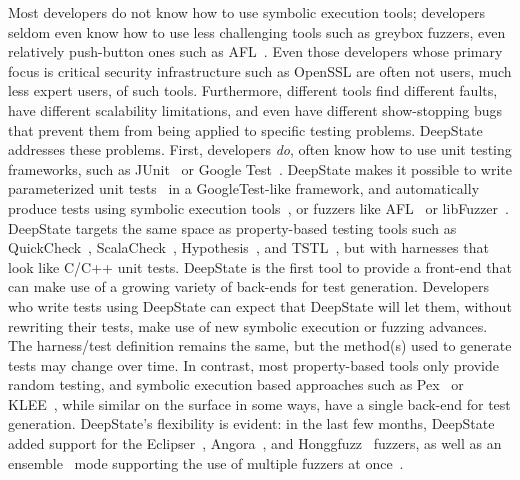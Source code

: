 Most developers do not know how to use symbolic execution tools; developers seldom even know how to use less challenging tools such as greybox fuzzers, even relatively push-button ones such as AFL~\cite{aflfuzz}.  Even those developers whose primary focus is critical security infrastructure such as OpenSSL are often not users, much less expert users, of such tools.  Furthermore, different tools find different faults, have different scalability limitations, and even have different show-stopping bugs that prevent them from being applied to specific testing problems.  DeepState~\cite{DeepState} addresses these problems.  First, developers \emph{do}, often know how to use unit testing frameworks, such as JUnit~\cite{JUnit} or Google Test~\cite{GoogleTest}. DeepState makes it possible to write parameterized unit tests~\cite{ParamUnit} in a GoogleTest-like framework, and automatically produce tests using symbolic execution tools~\cite{angr1,angr2,angr3,Manticore}, or fuzzers like AFL~\cite{aflfuzz} or libFuzzer~\cite{libFuzzer}.  DeepState targets the same space as property-based testing tools such as QuickCheck~\cite{ClaessenH00}, ScalaCheck~\cite{ScalaCheckDoc}, Hypothesis~\cite{Hypothesis}, and TSTL~\cite{NFM15,tstlsttt}, but with harnesses that look like C/C++ unit tests. DeepState is the first tool to provide a front-end that can make use of a growing variety of back-ends for test generation.  Developers who write tests using DeepState can expect that DeepState will let them, without rewriting their tests, make use of new symbolic execution or fuzzing advances.  The harness/test definition remains the same, but the method(s) used to generate tests may change over time.  In contrast, most property-based tools only provide random testing, and symbolic execution based approaches such as Pex~\cite{Pex,UnitMeister} or KLEE~\cite{KLEE}, while similar on the surface in some ways, have a single back-end for test generation. DeepState's flexibility is evident: in the last few months, DeepState added support for the Eclipser~\cite{eclipser}, Angora~\cite{angora}, and Honggfuzz~\cite{Honggfuzz} fuzzers, as well as an ensemble~\cite{enfuzz} mode  supporting  the use  of multiple fuzzers at once~\cite{ensemble}.


